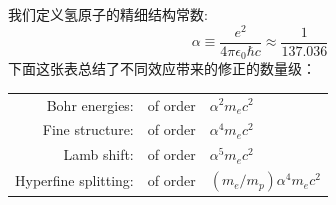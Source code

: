 \documentclass[a4paper,zihao=-4,linespread=1]{ctexrep}
\begin{document}
    我们定义氢原子的精细结构常数:
    \begin{equation}
        \boxed{\alpha\equiv\frac{e^2}{4\pi \epsilon_0\hbar c}\approx\frac{1}{137.036}}
    \end{equation}
    下面这张表总结了不同效应带来的修正的数量级：
    \begin{center}
        \begin{tabular}{|rll|}
            \hline Bohr energies: & of order & $\alpha^2 m_e c^2$ \\
            Fine structure: & of order & $\alpha^4 m_e c^2$ \\
            Lamb shift: & of order & $\alpha^5 m_e c^2$ \\
            Hyperfine splitting: & of order & $(m_e / m_p) \alpha^4 m_e c^2$ \\
            \hline
        \end{tabular}
    \end{center}
    
\end{document}
